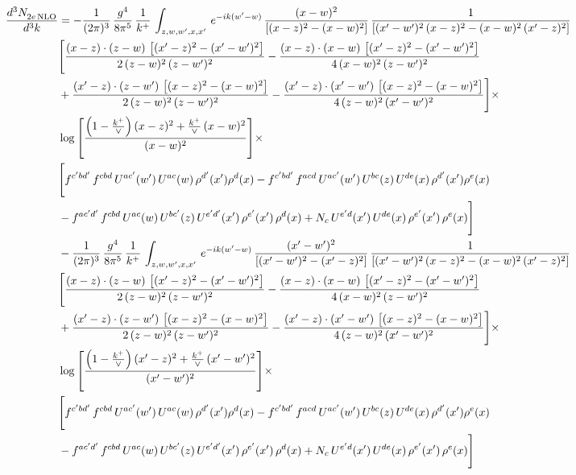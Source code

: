 \documentclass[10pt]{article}
\numberwithin{equation}{section}
\begin{document}
\begin{align}
 \frac{d^{3}N_{2e\,\rm NLO}^{\rm}}{d^{3}k}  & =   -\frac{1}{(2\pi)^{3}}\, \frac{g^{4}}{8\pi^{5}}\,\frac{1}{k^{+}}\,\int_{z,w,w^{\prime},x,x'}\, e^{-ik(w^{\prime}-w)}\,\frac{(x-w)^{2}}{\left[(x-z)^{2}-(x-w)^{2}\right]}\, \frac{1}{\left[(x'-w')^{2}\, (x-z)^{2} - (x-w)^{2}\, (x'-z)^{2}\right]} \notag \\ & \Bigg[\frac{(x-z)\cdot (z-w)\, \left[(x'-z)^{2}-(x'-w')^{2}\right]}{2\, (z-w)^{2}\, (z-w')^{2}}  - \frac{(x-z)\cdot (x-w)\,\left[(x'-z)^{2}-(x'-w')^{2}\right] }{4\,(x-w)^{2}\,(z-w')^{2}}\notag \\ & +\frac{(x'-z)\cdot (z-w')\, \left[(x-z)^{2}-(x-w)^{2}\right]}{2\, (z-w)^{2}\, (z-w')^{2}}-\frac{(x'-z)\cdot (x'-w')\, \left[(x-z)^{2}-(x-w)^{2}\right]}{4\, (z-w)^{2}\,(x'-w')^{2}}\Bigg]\times\,\notag \\ & \log{\left[\frac{\left(1-\frac{k^{+}}{\vee}\right)(x-z)^{2}+\frac{k^{+}}{\vee}\,(x-w)^{2}}{(x-w)^{2}}\right]}\times\,\notag \\ & \Bigg[f^{c'bd'}\,f^{cbd}\, U^{ac'}(w')\,U^{ac}(w)\,\rho^{d'}(x')\rho^{d}(x)- f^{c'bd'}\,f^{acd}\,U^{ac'}(w')\,U^{bc}(z)\,U^{de}(x)\,\rho^{d'}(x')\rho^{e}(x) \notag \\ & -f^{ac'd'}\,f^{cbd}\,U^{ac}(w)\,U^{bc'}(z)\,U^{e'd'}(x')\,\rho^{e'}(x')\,\rho^{d}(x) +N_{c}\,U^{e'd}(x')\,U^{de}(x)\,\rho^{e'}(x')\,\rho^{e}(x)\Bigg] \notag \\
& -\frac{1}{(2\pi)^{3}}\, \frac{g^{4}}{8\pi^{5}}\,\frac{1}{k^{+}}\,\int_{z,w,w^{\prime},x,x'}\, e^{-ik(w^{\prime}-w)}\, \frac{(x'-w')^{2}}{\left[(x'-w')^{2}-(x'-z)^{2}\right]}\, \frac{1}{\left[(x'-w')^{2}\, (x-z)^{2} - (x-w)^{2}\, (x'-z)^{2}\right]}  \notag \\ & \Bigg[\frac{(x-z)\cdot (z-w)\, \left[(x'-z)^{2}-(x'-w')^{2}\right]}{2\, (z-w)^{2}\, (z-w')^{2}}  - \frac{(x-z)\cdot (x-w)\,\left[(x'-z)^{2}-(x'-w')^{2}\right] }{4\,(x-w)^{2}\,(z-w')^{2}}\notag \\ & +\frac{(x'-z)\cdot (z-w')\, \left[(x-z)^{2}-(x-w)^{2}\right]}{2\, (z-w)^{2}\, (z-w')^{2}}-\frac{(x'-z)\cdot (x'-w')\, \left[(x-z)^{2}-(x-w)^{2}\right]}{4\, (z-w)^{2}\,(x'-w')^{2}}\Bigg]\times\,\notag \\ & \log{\left[\frac{\left(1-\frac{k^{+}}{\vee}\right)(x'-z)^{2}+\frac{k^{+}}{\vee}\,(x'-w')^{2}}{(x'-w')^{2}}\right]}\times\notag \\ & \Bigg[f^{c'bd'}\,f^{cbd}\, U^{ac'}(w')\,U^{ac}(w)\,\rho^{d'}(x')\rho^{d}(x)- f^{c'bd'}\,f^{acd}\,U^{ac'}(w')\,U^{bc}(z)\,U^{de}(x)\,\rho^{d'}(x')\rho^{e}(x) \notag \\ & -f^{ac'd'}\,f^{cbd}\,U^{ac}(w)\,U^{bc'}(z)\,U^{e'd'}(x')\,\rho^{e'}(x')\,\rho^{d}(x) +N_{c}\,U^{e'd}(x')\,U^{de}(x)\,\rho^{e'}(x')\,\rho^{e}(x)\Bigg]
\end{align}
\end{document}
